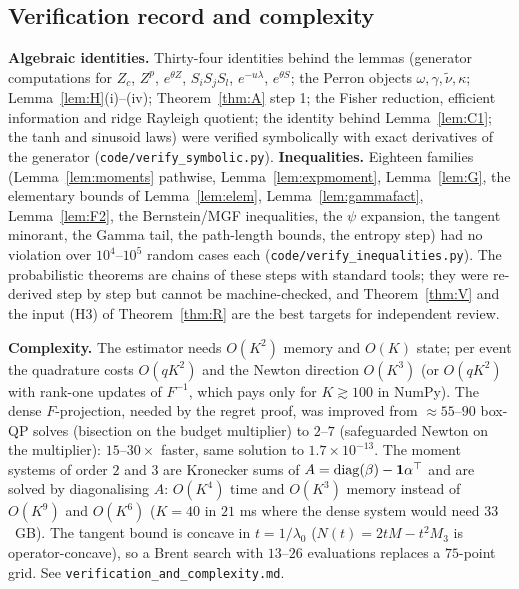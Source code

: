 \subsection{Verification record and complexity}\label{sec:verif}
\textbf{Algebraic identities.} Thirty-four identities behind the lemmas (generator computations for $Z_c$, $Z^p$, $e^{\theta Z}$, $S_iS_jS_l$, $e^{-u\lambda}$, $e^{\theta S}$; the Perron objects $\omega,\gamma,\tilde\nu,\kappa$; Lemma~\ref{lem:H}(i)--(iv); Theorem~\ref{thm:A} step 1; the Fisher reduction, efficient information and ridge Rayleigh quotient; the identity behind Lemma~\ref{lem:C1}; the tanh and sinusoid laws) were verified symbolically with exact derivatives of the generator (\texttt{code/verify\_symbolic.py}). \textbf{Inequalities.} Eighteen families (Lemma~\ref{lem:moments} pathwise, Lemma~\ref{lem:expmoment}, Lemma~\ref{lem:G}, the elementary bounds of Lemma~\ref{lem:elem}, Lemma~\ref{lem:gammafact}, Lemma~\ref{lem:F2}, the Bernstein/MGF inequalities, the $\psi$ expansion, the tangent minorant, the Gamma tail, the path-length bounds, the entropy step) had no violation over $10^4$--$10^5$ random cases each (\texttt{code/verify\_inequalities.py}). The probabilistic theorems are chains of these steps with standard tools; they were re-derived step by step but cannot be machine-checked, and Theorem~\ref{thm:V} and the input (H3) of Theorem~\ref{thm:R} are the best targets for independent review.

\textbf{Complexity.} The estimator needs $O(K^2)$ memory and $O(K)$ state; per event the quadrature costs $O(qK^2)$ and the Newton direction $O(K^3)$ (or $O(qK^2)$ with rank-one updates of $F^{-1}$, which pays only for $K\gtrsim100$ in NumPy). The dense $F$-projection, needed by the regret proof, was improved from $\approx55$--$90$ box-QP solves (bisection on the budget multiplier) to $2$--$7$ (safeguarded Newton on the multiplier): $15$--$30\times$ faster, same solution to $1.7\times10^{-13}$. The moment systems of order $2$ and $3$ are Kronecker sums of $A=\mathrm{diag}(\beta)-\mathbf 1\alpha^{\top}$ and are solved by diagonalising $A$: $O(K^4)$ time and $O(K^3)$ memory instead of $O(K^9)$ and $O(K^6)$ ($K=40$ in $21$ ms where the dense system would need $33$~GB). The tangent bound is concave in $t=1/\lambda_0$ ($N(t)=2tM-t^2M_3$ is operator-concave), so a Brent search with $13$--$26$ evaluations replaces a $75$-point grid. See \texttt{verification\_and\_complexity.md}.

